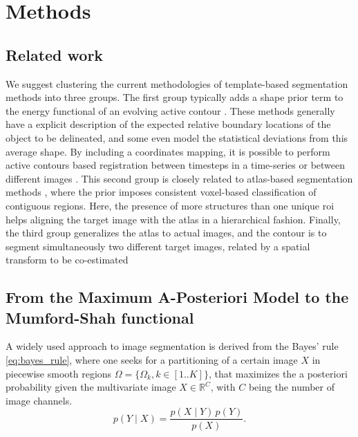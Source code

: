 \section{Methods}
\label{sec:methods}
%
\subsection{Related work}
\label{sec:methods_background}

We suggest clustering the current methodologies of template-based segmentation 
methods into three groups. The first group typically adds a shape prior term to 
the energy functional of an evolving active contour \citep{bresson_variational_2006,c
han_level_2005,chen_using_2002,cremers_kernel_2006,gastaud_combining_2004}.
These methods generally have a explicit description of the expected relative boundary 
locations of the object to be delineated, and some even model the statistical deviations
from this average shape. By including a coordinates mapping, it is possible to perform
active contours based registration between timesteps in a time-series or between different
images \citep{wyatt_map_2003,paragios_level_2003,vemuri_joint_2003,yezzi_variational_2003}.
This second group is closely related to atlas-based segmentation methods 
\citep{gorthi_segmentation_2009,gorthi_active_2011,pohl_unifying_2005,
pohl_bayesian_2006,wang_joint_2006}, where the prior 
imposes consistent voxel-based classification of contiguous regions. Here, the 
presence of more structures than one unique \gls{roi} helps aligning the target image 
with the atlas in a hierarchical fashion. Finally, the third group generalizes 
the atlas to actual images, and the contour is to segment simultaneously two 
different target images, related by a spatial transform to be co-estimated

\subsection{From the Maximum A-Posteriori Model to the Mumford-Shah functional}
\label{sec:methods_map}
%
A widely used approach to image segmentation is derived from the
Bayes' rule \eqref{eq:bayes_rule}, where one seeks for a partitioning
of a certain image $X$ in piecewise smooth regions $\Omega = \lbrace \Omega_k , 
k\in\left[ 1 .. K \right] \rbrace$,  that maximizes the a posteriori 
probability given the multivariate image $X \in \mathbb{R}^C$, 
with $C$ being the number of image channels.
\begin{equation}
p(Y \mid X) = \frac{p(X \mid Y)\, p(Y)}{p(X)}.
\label{eq:bayes_rule}
\end{equation}


